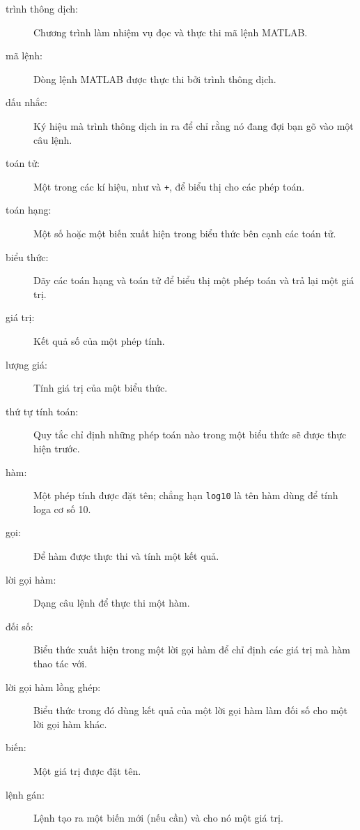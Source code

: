 \documentclass[12pt]{book}
\begin{document}
\begin{description}

\item[trình thông dịch:] Chương trình làm nhiệm vụ đọc và thực thi mã lệnh MATLAB.

\item[mã lệnh:] Dòng lệnh MATLAB được thực thi bởi trình thông dịch.

\item[dấu nhắc:] Ký hiệu mà trình thông dịch in ra để chỉ rằng nó đang 
đợi bạn gõ vào một câu lệnh.

\item[toán tử:] Một trong các kí hiệu, như {\tt *} và {\tt +}, để biểu thị cho 
các phép toán.

\item[toán hạng:] Một số hoặc một biến xuất hiện trong biểu thức bên cạnh 
các toán tử.

\item[biểu thức:] Dãy các toán hạng và toán tử để biểu thị một phép toán 
và trả lại một giá trị.

\item[giá trị:] Kết quả số của một phép tính.

\item[lượng giá:] Tính giá trị của một biểu thức.

\item[thứ tự tính toán:] Quy tắc chỉ định những phép toán nào trong một 
biểu thức sẽ được thực hiện trước.

\item[hàm:] Một phép tính được đặt tên; chẳng hạn {\tt log10} là tên hàm
dùng để tính loga cơ số 10.

\item[gọi:] Để hàm được thực thi và tính một kết quả.

\item[lời gọi hàm:] Dạng câu lệnh để thực thi một hàm.

\item[đối số:] Biểu thức xuất hiện trong một lời gọi hàm để chỉ định các
giá trị mà hàm thao tác với.

\item[lời gọi hàm lồng ghép:] Biểu thức trong đó dùng kết quả của một 
lời gọi hàm làm đối số cho một lời gọi hàm khác.

\item[biến:] Một giá trị được đặt tên.   

\item[lệnh gán:] Lệnh tạo ra một biến mới (nếu cần) và cho nó một
giá trị.


\end{description}
\end{document}
